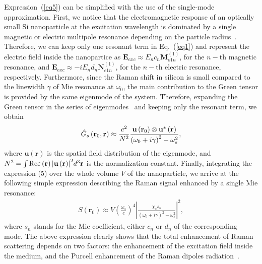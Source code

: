             Expression~(\ref{eq5}) can be simplified with the use of the single-mode approximation. First, we notice that the
        electromagnetic response of an optically small Si nanoparticle at the excitation wavelength is dominated by a single
        magnetic or electric multipole resonance depending on the particle radius~\cite{evlyukhin2010optical}. Therefore, we can keep
        only one resonant term in Eq.~(\ref{eq1}) and represent the electric field inside the nanopartice as ${
        {\mathbf{{E}}}_{exc}} \approx {E_n}{c_n}{\mathbf{M}}_{o1n}^{(1)}$, for the $n-$th magnetic resonance, and
        ${{\mathbf{{E}}}_{exc}}\approx -i{E_n}{d_n}{\mathbf{N}}_{e1n}^{(1)}$, for the $n-$th electric resonance,
        respectively. Furthermore, since the Raman shift in silicon is small compared to the linewidth $\gamma$ of
        Mie resonance at $\omega_0$, the main contribution to the Green tensor is provided by the same eigenmode of
        the system. Therefore, expanding the Green tensor in the series of eigenmodes~\cite{ishimaru1991electromagnetic} and keeping only
        the resonant term, we obtain
        \begin{align}
            {\hat G_s}\left( {{{\bf{r}}_0},{\bf{r}}} \right) \approx \frac{{{c^2}}}{{{N^2}}}\frac{{{\bf{u}}\left( {{{\bf{r}}_0}} \right) \otimes
            {\bf{u}}^*\left( {\bf{r}} \right)}}{{{{\left( {{\omega _0} + i\gamma } \right)}^2} - \omega _s^2}},
            \label{eq8}
        \end{align}
        where ${{\mathbf{u}}\left( {{\mathbf r}} \right)}$ is the spatial field distribution of the eigenmode, and
        ${N^2} = {\int {{\mathop{\rm Re}\nolimits} \varepsilon \left( {\bf{r}} \right)\left| {{\bf{u}}\left( {\bf{r}} \right)} \right|} ^2}{d^3}{\bf{r}}$
        is the normalization constant. Finally, integrating the expression (5) over the whole volume $V$ of the nanoparticle, we
        arrive at the following simple expression describing the Raman signal enhanced by a single Mie resonance:
        \begin{align}
            S\left( {{{\mathbf{r}}_0}} \right) \approx V{\left( {\frac{{{\omega _s}}}{c}} \right)^4}{\left| {\frac{{{\chi_s s_n}}}{{{{\left( {{\omega
            _0} + i\gamma } \right)}^2} - \omega _s^2}}} \right|^2},
            \label{eq9}
        \end{align}
        where $s_n$ stands for the Mie coefficient, either $c_n$ or $d_n$ of the corresponding mode. The above expression clearly
        shows that the total enhancement of Raman scattering depends on two factors: the enhancement of the excitation field
        inside the medium, and the Purcell enhancement of the Raman dipoles radiation~\cite{checoury2010deterministic}.


